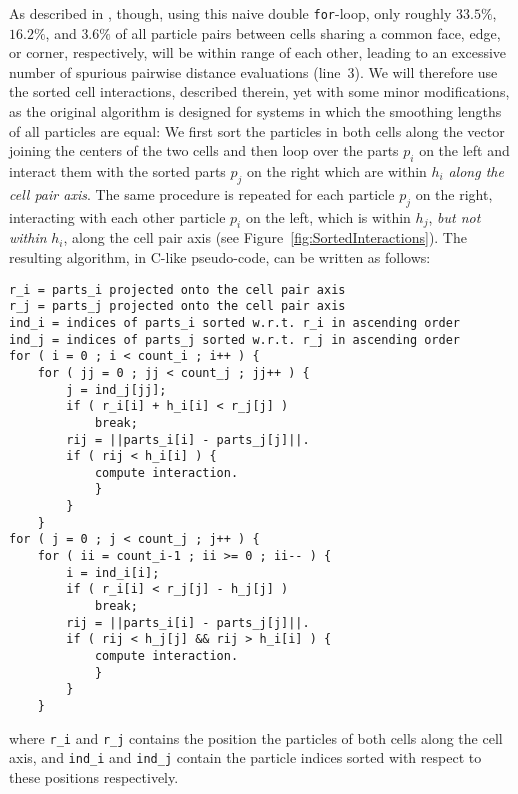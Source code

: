 \documentclass[final]{siamltex}
\newcommand{\fig}[1]
    {Figure~\ref{fig:#1}}
\begin{document}
As described in \cite{ref:Gonnet2007}, though, using this
naive double {\tt for}-loop, only roughly $33.5\%$, $16.2\%$,
and $3.6\%$ of all particle
pairs between cells sharing a common face, edge, or corner, respectively,
will be within range of each other, leading
to an excessive number of spurious pairwise distance evaluations (line~3).
We will therefore use the sorted cell
interactions, described therein, yet with some minor modifications, as
the original algorithm is designed for systems in which the
smoothing lengths of all particles are equal:
We first sort the particles in both cells along the vector joining
the centers of the two cells and then loop over the
parts $p_i$ on the left and interact them with the sorted parts $p_j$
on the right which are within $h_i$ {\em along the cell pair axis}.
The same procedure is repeated for each particle $p_j$ on the
right, interacting with each other particle $p_i$ on the
left, which is within $h_j$, {\em but not within} $h_i$, along
the cell pair axis (see \fig{SortedInteractions}).
The resulting algorithm, in C-like pseudo-code, can be written as follows:
        
\begin{center}\begin{minipage}{0.8\textwidth}
    \begin{lstlisting}
r_i = parts_i projected onto the cell pair axis
r_j = parts_j projected onto the cell pair axis
ind_i = indices of parts_i sorted w.r.t. r_i in ascending order
ind_j = indices of parts_j sorted w.r.t. r_j in ascending order
for ( i = 0 ; i < count_i ; i++ ) {
    for ( jj = 0 ; jj < count_j ; jj++ ) {
        j = ind_j[jj];
        if ( r_i[i] + h_i[i] < r_j[j] )
            break;
        rij = ||parts_i[i] - parts_j[j]||.
        if ( rij < h_i[i] ) {
            compute interaction.
            }
        }
    }
for ( j = 0 ; j < count_j ; j++ ) {
    for ( ii = count_i-1 ; ii >= 0 ; ii-- ) {
        i = ind_i[i];
        if ( r_i[i] < r_j[j] - h_j[j] )
            break;
        rij = ||parts_i[i] - parts_j[j]||.
        if ( rij < h_j[j] && rij > h_i[i] ) {
            compute interaction.
            }
        }
    }
    \end{lstlisting}
\end{minipage}\end{center}
        
\noindent where {\tt r\_i} and {\tt r\_j} contains the position
the particles of both cells along the cell axis, and
{\tt ind\_i} and {\tt ind\_j} contain the particle indices
sorted with respect to these positions respectively.
\end{document}
